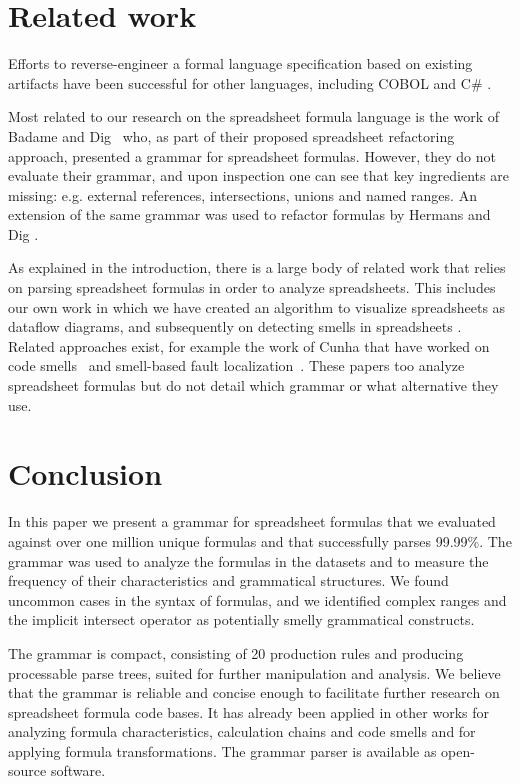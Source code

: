 \documentclass[conference]{IEEEtran}
\begin{document}
\section{Related work}
\label{section:relatedWork}
Efforts to reverse-engineer a formal language specification based on existing artifacts have been successful for other languages, including COBOL \cite{van1997obtaining} and C\# \cite{zaytsev2010recovery}.

Most related to our research on the spreadsheet formula language is the work of Badame and Dig~\cite{badame2012refactoring} who, as part of their proposed spreadsheet refactoring approach, presented a grammar for spreadsheet formulas. However, they do not evaluate their grammar, and upon inspection one can see that key ingredients are missing: e.g. external references, intersections, unions and named ranges. An extension of the same grammar was used to refactor formulas by Hermans and Dig \cite{hermans2014bumblebee}.

As explained in the introduction, there is a large body of related work that relies on parsing spreadsheet formulas in order to analyze spreadsheets. This includes our own work in which we have created an algorithm to visualize spreadsheets as dataflow diagrams\cite{DBLP:conf/icse/HermansPD11}, and subsequently on detecting smells in spreadsheets \cite{DBLP:conf/icse/HermansPD12,DBLP:conf/icsm/Hermans212}. Related approaches exist, for example the work of Cunha that have worked on code smells~\cite{iccsa12} and smell-based fault localization~\cite{conf/icsme/CunhaFMPS14}. These papers too analyze spreadsheet formulas but do not detail which grammar or what alternative they use.

\section{Conclusion}
\label{section:conclusion}
In this paper we present a grammar for spreadsheet formulas that we evaluated against over one million unique formulas and that successfully parses 99.99\%. The grammar was used to analyze the formulas in the datasets and to measure the frequency of their characteristics and grammatical structures. We found uncommon cases in the syntax of formulas, and we identified complex ranges and the implicit intersect operator as potentially smelly grammatical constructs.

The grammar is compact, consisting of 20 production rules and producing processable parse trees, suited for further manipulation and analysis. We believe that the grammar is reliable and concise enough to facilitate further research on spreadsheet formula code bases. It has already been applied in other works for analyzing formula characteristics, calculation chains and code smells and for applying formula transformations. The grammar parser is available as open-source software.
\end{document}
